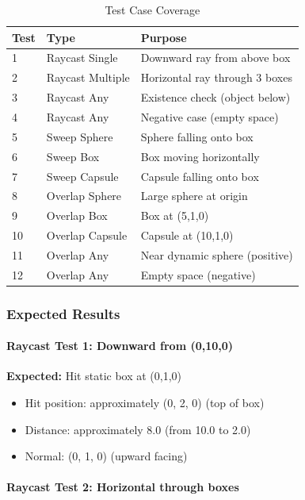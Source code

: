 \begin{table}[h]
\centering
\small
\begin{tabular}{|l|l|p{5cm}|}
\hline
\textbf{Test} & \textbf{Type} & \textbf{Purpose} \\
\hline
1 & Raycast Single & Downward ray from above box \\
\hline
2 & Raycast Multiple & Horizontal ray through 3 boxes \\
\hline
3 & Raycast Any & Existence check (object below) \\
\hline
4 & Raycast Any & Negative case (empty space) \\
\hline
5 & Sweep Sphere & Sphere falling onto box \\
\hline
6 & Sweep Box & Box moving horizontally \\
\hline
7 & Sweep Capsule & Capsule falling onto box \\
\hline
8 & Overlap Sphere & Large sphere at origin \\
\hline
9 & Overlap Box & Box at (5,1,0) \\
\hline
10 & Overlap Capsule & Capsule at (10,1,0) \\
\hline
11 & Overlap Any & Near dynamic sphere (positive) \\
\hline
12 & Overlap Any & Empty space (negative) \\
\hline
\end{tabular}
\caption{Test Case Coverage}
\end{table}

\subsubsection{Expected Results}

\paragraph{Raycast Test 1: Downward from (0,10,0)}

\textbf{Expected:} Hit static box at (0,1,0)
\begin{itemize}
    \item Hit position: approximately (0, 2, 0) (top of box)
    \item Distance: approximately 8.0 (from 10.0 to 2.0)
    \item Normal: (0, 1, 0) (upward facing)
\end{itemize}

\paragraph{Raycast Test 2: Horizontal through boxes}

